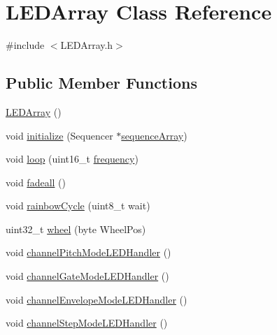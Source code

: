 \hypertarget{class_l_e_d_array}{}\section{L\+E\+D\+Array Class Reference}
\label{class_l_e_d_array}


{\ttfamily \#include $<$L\+E\+D\+Array.\+h$>$}

\subsection*{Public Member Functions}
\begin{DoxyCompactItemize}
\item 
\hyperlink{class_l_e_d_array_a38e049928e05c44035bf47ed888c319f}{L\+E\+D\+Array} ()
\item 
void \hyperlink{class_l_e_d_array_affcc24a132375e42e76f231da3744542}{initialize} (Sequencer $\ast$\hyperlink{class_l_e_d_array_a93c18ec03393f639c7e0a11a3324c922}{sequence\+Array})
\item 
void \hyperlink{class_l_e_d_array_a13f7dd3ae81862c31331199c732f8a3e}{loop} (uint16\+\_\+t \hyperlink{global_8h_acdfc8898c9e67fbcec81f3b04ae61bd9}{frequency})
\item 
void \hyperlink{class_l_e_d_array_aa9d1531481da8b4f236a8c187f986b0d}{fadeall} ()
\item 
void \hyperlink{class_l_e_d_array_af787dadd33b8c2049de93f8e91bc60ab}{rainbow\+Cycle} (uint8\+\_\+t wait)
\item 
uint32\+\_\+t \hyperlink{class_l_e_d_array_a783c6a0ef721d76b6b65aead2322e059}{wheel} (byte Wheel\+Pos)
\item 
void \hyperlink{class_l_e_d_array_a602c56fdb10d7bf66f8d681081a99b83}{channel\+Pitch\+Mode\+L\+E\+D\+Handler} ()
\item 
void \hyperlink{class_l_e_d_array_ab90f5a669b0faf8853070e12b99c4b3d}{channel\+Gate\+Mode\+L\+E\+D\+Handler} ()
\item 
void \hyperlink{class_l_e_d_array_a4fdfa734a42f2e2f577a0be7ce8953d5}{channel\+Envelope\+Mode\+L\+E\+D\+Handler} ()
\item 
void \hyperlink{class_l_e_d_array_a81dfe62b22624f9f29d57da0298043fc}{channel\+Step\+Mode\+L\+E\+D\+Handler} ()
\end{DoxyCompactItemize}
